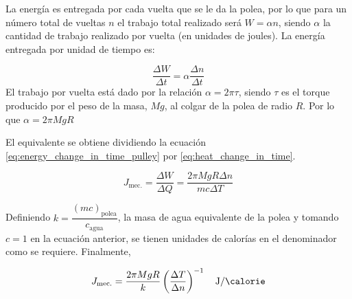 La energía es entregada por cada vuelta que se le da la polea, por lo que para un número total de vueltas $n$ el trabajo total realizado será $W = \alpha n$, siendo $\alpha$ la cantidad de trabajo realizado por vuelta (en unidades de joules). 
La energía entregada por unidad de tiempo es:

\begin{equation}
    \label{eq:energy_change_in_time_pulley}
    \frac{\Delta W}{\Delta t} = \alpha \frac{\Delta n}{\Delta t}
\end{equation}
El trabajo por vuelta está dado por la relación $\alpha = 2\pi\tau $, siendo $\tau$ es el torque producido por el peso de la masa, $Mg$, al colgar de la polea de radio $R$. Por lo que  $\alpha = 2\pi MgR$

El equivalente se obtiene dividiendo la ecuación \eqref{eq:energy_change_in_time_pulley} por \eqref{eq:heat_change_in_time}. 

\begin{equation}
    J_{\text{mec.}}=\frac{\Delta W}{\Delta Q} = \frac{2\pi MgR \Delta n}{mc \Delta T}
\end{equation}

Definiendo $k=\dfrac{(mc)_{\text{polea}}}{c_{\text{agua}}}$, la masa de agua equivalente de la polea y tomando $c=1$ en la ecuación anterior, se tienen unidades de calorías en el denominador como se requiere. Finalmente, 

\begin{equation}
    \label{eq:mechanical_equivalent}
    J_{\text{mec.}} = \frac{2\pi MgR}{k}\left(\frac{\Delta T}{\Delta n}\right)^{-1} \quad\si{\joule\per\calorie}
\end{equation}


